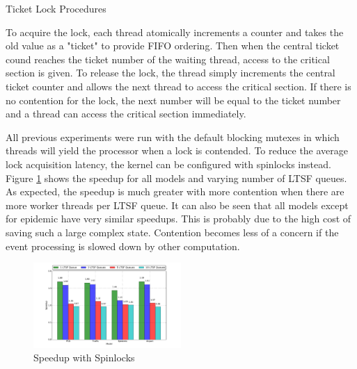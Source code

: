 \documentclass[11pt]{book}
\begin{document}
\begin{algorithm}
\DontPrintSemicolon
{}

    \;


    \caption{Ticket Lock Procedures\cite{wiki:ticketlock-15}}\label{ticket_lock}
\end{algorithm}

To acquire the lock, each thread atomically increments a counter and takes the old value as
a "ticket" to provide FIFO ordering. Then when the central ticket cound reaches the ticket number
of the waiting thread, access to the critical section is given. To release the lock, the thread
simply increments the central ticket counter and allows the next thread to access the critical section.
If there is no contention for the lock, the next number will be equal to the ticket number and
a thread can access the critical section immediately.

All previous experiments were run with the default blocking mutexes in which threads will yield
the processor when a lock is contended. To reduce the average lock acquisition latency, the
kernel can be configured with spinlocks instead. Figure \ref{spinlock_speedup} shows the speedup
for all models and varying number of LTSF queues. As expected, the speedup is much greater with
more contention when there are more worker threads per LTSF queue. It can also be seen that all
models except for epidemic have very similar speedups. This is probably due to the high cost
of saving such a large complex state. Contention becomes less of a concern if the event processing
is slowed down by other computation.

\begin{figure}
\centering
  \includegraphics[width=0.5\textwidth,quiet]{figs/pending_event_set/spinlock_speedup.pdf}
  \caption{Speedup with Spinlocks}\label{spinlock_speedup}
\end{figure}
\end{document}
